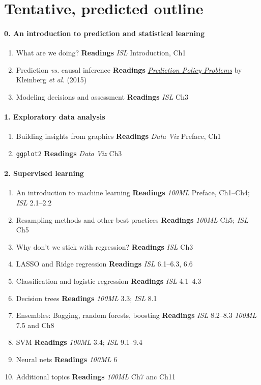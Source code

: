 \documentclass[10pt]{article}
\begin{document}
\newpage

\section*{Tentative, predicted outline}

\paragraph{0. An introduction to prediction and statistical learning}
\begin{enumerate}
  \item What are we doing? \textbf{Readings} \textit{ISL} Introduction, Ch1
  \item Prediction \textit{vs.} causal inference \textbf{Readings} \href{https://www.aeaweb.org/articles?id=10.1257/aer.p20151023}{\textit{Prediction Policy Problems}} by Kleinberg \textit{et al.} (2015)
  \item Modeling decisions and assessment \textbf{Readings} \textit{ISL} Ch3
\end{enumerate}

\paragraph{1. Exploratory data analysis}
\begin{enumerate}
  \item Building insights from graphics \textbf{Readings} \textit{Data Viz} Preface, Ch1
  \item \texttt{ggplot2} \textbf{Readings} \textit{Data Viz} Ch3
\end{enumerate}

\paragraph{2. Supervised learning}
\begin{enumerate}
  \item An introduction to machine learning \textbf{Readings} \textit{100ML} Preface, Ch1--Ch4; \textit{ISL} 2.1--2.2
  \item Resampling methods and other best practices \textbf{Readings} \textit{100ML} Ch5; \textit{ISL} Ch5
  \item Why don't we stick with regression? \textbf{Readings} \textit{ISL} Ch3
  \item LASSO and Ridge regression \textbf{Readings} \textit{ISL} 6.1--6.3, 6.6
  \item Classification and logistic regression \textbf{Readings} \textit{ISL} 4.1--4.3
  \item Decision trees \textbf{Readings} \textit{100ML} 3.3; \textit{ISL} 8.1
  \item Ensembles: Bagging, random forests, boosting \textbf{Readings} \textit{ISL} 8.2--8.3 \textit{100ML} 7.5 and Ch8
  \item SVM \textbf{Readings} \textit{100ML} 3.4; \textit{ISL} 9.1--9.4
  \item Neural nets \textbf{Readings} \textit{100ML} 6
  \item Additional topics \textbf{Readings} \textit{100ML} Ch7 anc Ch11
\end{enumerate}
\end{document}
